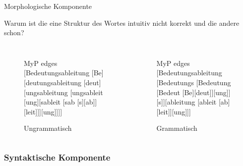 \begin{frame}{Morphologische Komponente}

	\ea Warum ist die eine Struktur des Wortes  intuitiv nicht korrekt und die andere schon?
	\z
			

\begin{columns}

\begin{figure}[b]
	
\scriptsize{
		\begin{forest}MyP edges
		[Bedeutungsableitung [Be][deutungsableitung [deut][ungsableitung [ungsableit [ung][sableit [sab [s][ab]][leit]]][ung]]]]
		\end{forest}
}
		
\caption{Ungrammatisch}

\end{figure}

\begin{figure}[b]
	\scriptsize{
		\begin{forest}MyP edges
		[Bedeutungsableitung [Bedeutungs [Bedeutung [Bedeut [Be][deut]][ung]][s]][ableitung [ableit [ab][leit]][ung]]]
		\end{forest}}
			
	\caption{Grammatisch}

\end{figure}

\end{columns}
\end{frame}


\subsubsection{Syntaktische Komponente}
	
